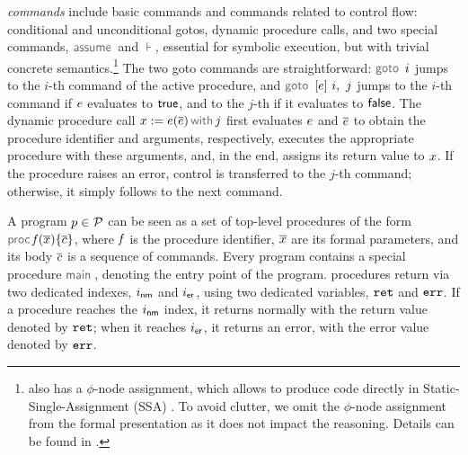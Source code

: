 \jsil \emph{commands} include \jsil basic commands and commands related to control flow: conditional and unconditional gotos, dynamic procedure calls, and two special commands, $\assume$ and $\assert$, essential for symbolic execution, but with trivial concrete semantics.\footnote{\jsil also has a $\phi$-node assignment, which allows \JSComp to produce code directly in Static-Single-Assignment (SSA) \cite{SSA}. To avoid clutter, we omit the $\phi$-node assignment from the formal presentation as it does not impact the reasoning. Details can be found in \cite{javert}.} 
The two goto commands are straightforward: $\goto \ i$ jumps to the $i$-th command of the active procedure, and $\ifgoto{\jsilexpr}{i}{j}$ jumps to the $i$-th command if $e$ evaluates to ${\sf true}$, and to the $j$-th if it evaluates to ${\sf false}$. 
The dynamic procedure call $\jsilcall{\jvar}{\jsilexpr}{\jvec{\jsilexpr}}{j}$ first evaluates  $e$ and $\overline{e}$ to obtain the procedure identifier and arguments, respectively, executes the appropriate procedure with these arguments, and, in the end, assigns its return value to $x$.
If the procedure raises an error, control is transferred to the $j$-th command; otherwise, it simply follows to the next command. 

A \jsil program $p \in \mathcal{P}$ can be seen as a set of top-level procedures of the form $\procedure{\pid}{\jvec{\jvar}}{\jvec{\jcmd}}$, where $\mathit{f}$ is the procedure identifier, $\overline{x}$ are its formal parameters, and its body ${\overline{c}}$  is a sequence of \jsil commands.
Every \jsil program contains a special procedure $\jsilmain$\hspace{-2pt}, denoting the entry point of the program. 
\jsil procedures return via two dedicated indexes, $i_{{\sf nm}}$ and $i_{{\sf er}}$, using two dedicated variables, $\mathtt{ret}$ and $\mathtt{err}$. If a procedure reaches the $i_{{\sf nm}}$ index, it returns normally with the return value denoted by $\mathtt{ret}$; when it reaches $i_{{\sf er}}$, it returns an error, with the error value denoted by $\mathtt{err}$.

%

